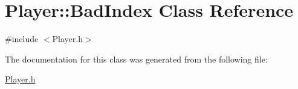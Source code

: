 \hypertarget{class_player_1_1_bad_index}{}\section{Player\+:\+:Bad\+Index Class Reference}
\label{class_player_1_1_bad_index}


{\ttfamily \#include $<$Player.\+h$>$}



The documentation for this class was generated from the following file\+:\begin{DoxyCompactItemize}
\item 
\mbox{\hyperlink{_player_8h}{Player.\+h}}\end{DoxyCompactItemize}
